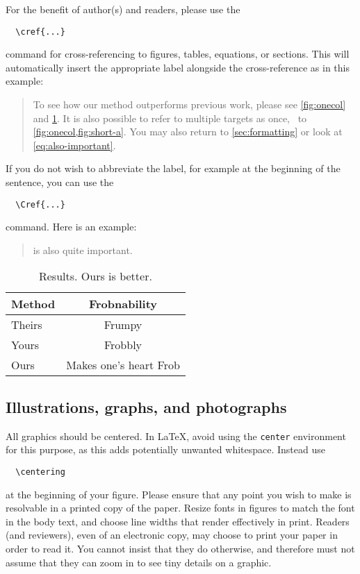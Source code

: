 \documentclass[10pt,twocolumn,letterpaper]{article}
\begin{document}
For the benefit of author(s) and readers, please use the
{\small\begin{verbatim}
  \cref{...}
\end{verbatim}}  command for cross-referencing to figures, tables, equations, or sections.
This will automatically insert the appropriate label alongside the cross-reference as in this example:
\begin{quotation}
  To see how our method outperforms previous work, please see \cref{fig:onecol} and \cref{tab:example}.
  It is also possible to refer to multiple targets as once, \eg~to \cref{fig:onecol,fig:short-a}.
  You may also return to \cref{sec:formatting} or look at \cref{eq:also-important}.
\end{quotation}
If you do not wish to abbreviate the label, for example at the beginning of the sentence, you can use the
{\small\begin{verbatim}
  \Cref{...}
\end{verbatim}}
command. Here is an example:
\begin{quotation}
   is also quite important.
\end{quotation}



\begin{table}
  \centering
  \begin{tabular}{@{}lc@{}}
    \toprule
    Method & Frobnability \\
    \midrule
    Theirs & Frumpy \\
    Yours & Frobbly \\
    Ours & Makes one's heart Frob\\
    \bottomrule
  \end{tabular}
  \caption{Results.   Ours is better.}
  \label{tab:example}
\end{table}

\subsection{Illustrations, graphs, and photographs}

All graphics should be centered.
In \LaTeX, avoid using the \texttt{center} environment for this purpose, as this adds potentially unwanted whitespace.
Instead use
{\small\begin{verbatim}
  \centering
\end{verbatim}}
at the beginning of your figure.
Please ensure that any point you wish to make is resolvable in a printed copy of the paper.
Resize fonts in figures to match the font in the body text, and choose line widths that render effectively in print.
Readers (and reviewers), even of an electronic copy, may choose to print your paper in order to read it.
You cannot insist that they do otherwise, and therefore must not assume that they can zoom in to see tiny details on a graphic.
\end{document}
